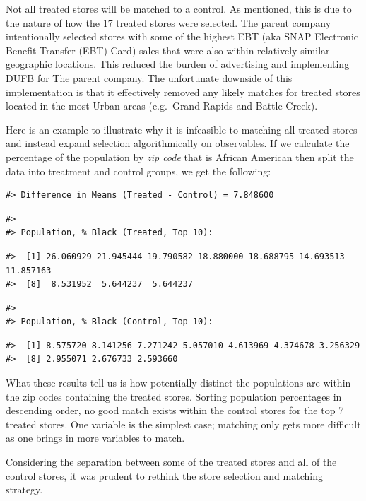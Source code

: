 \documentclass[12pt,letterpaperpaper,]{book}
\begin{document}
Not all treated stores will be matched to a control. As mentioned, this
is due to the nature of how the 17 treated stores were selected. The
parent company intentionally selected stores with some of the highest
EBT (aka SNAP Electronic Benefit Transfer (EBT) Card) sales that were
also within relatively similar geographic locations. This reduced the
burden of advertising and implementing DUFB for The parent company. The
unfortunate downside of this implementation is that it effectively
removed any likely matches for treated stores located in the most Urban
areas (e.g.~Grand Rapids and Battle Creek).

Here is an example to illustrate why it is infeasible to matching all
treated stores and instead expand selection algorithmically on
observables. If we calculate the percentage of the population by
\emph{zip code} that is African American then split the data into
treatment and control groups, we get the following:

\begin{verbatim}
#> Difference in Means (Treated - Control) = 7.848600
\end{verbatim}

\begin{verbatim}
#> 
#> Population, % Black (Treated, Top 10):
\end{verbatim}

\begin{verbatim}
#>  [1] 26.060929 21.945444 19.790582 18.880000 18.688795 14.693513 11.857163
#>  [8]  8.531952  5.644237  5.644237
\end{verbatim}

\begin{verbatim}
#> 
#> Population, % Black (Control, Top 10):
\end{verbatim}

\begin{verbatim}
#>  [1] 8.575720 8.141256 7.271242 5.057010 4.613969 4.374678 3.256329
#>  [8] 2.955071 2.676733 2.593660
\end{verbatim}

What these results tell us is how potentially distinct the populations
are within the zip codes containing the treated stores. Sorting
population percentages in descending order, no good match exists within
the control stores for the top 7 treated stores. One variable is the
simplest case; matching only gets more difficult as one brings in more
variables to match.

Considering the separation between some of the treated stores and all of
the control stores, it was prudent to rethink the store selection and
matching strategy.
\end{document}
